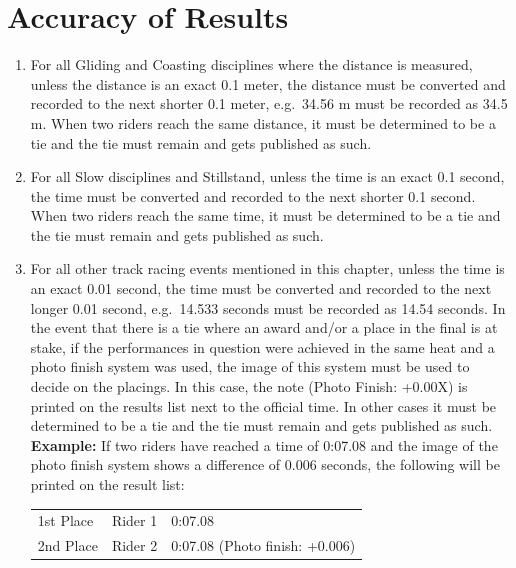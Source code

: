 \section{Accuracy of Results}

\begin{enumerate}[leftmargin=1.5em,labelsep=*]
	\item For all Gliding and Coasting disciplines where the distance is measured, unless the distance is an exact 
  0.1 meter, the distance must be converted and recorded to the next shorter 0.1 meter, e.g.\ 34.56 m 
  must be recorded as 34.5 m.
	When two riders reach the same distance, it must be determined to be a tie and the tie 
  must remain and gets published as such.
	
	\item For all Slow disciplines and Stillstand, unless the time is an exact 0.1 second, 
  the time must be converted and recorded to the next shorter 0.1 second.
	When two riders reach the same time, it must be determined to be a tie and the tie must 
  remain and gets published as such.
	
	\item For all other track racing events mentioned in this chapter, unless the time is an exact 0.01 second, 
  the time must be converted and recorded to the next longer 0.01 second, e.g.\ 14.533 seconds 
  must be recorded as 14.54 seconds.
	In the event that there is a tie where an award and/or a place in the final is at stake, 
  if the performances in question were achieved in the same heat and a photo finish system was used, 
  the image of this system must be used to decide on the placings.
	In this case, the note (Photo Finish: +0.00X) is printed on the results list next to the official time. 
  In other cases it must be determined to be a tie and the tie must remain and gets published as such.\\
  
	\textbf{Example:} If two riders have reached a time of 0:07.08 and the image of the photo finish 
  system shows a difference of 0.006 seconds, the following will be printed on the result list:\\
	\begin{tabular}{l l l}
	1st Place & Rider 1 & 0:07.08 \\
	2nd Place & Rider 2 & 0:07.08 (Photo finish: +0.006)\\
	\end{tabular}
\end{enumerate}


